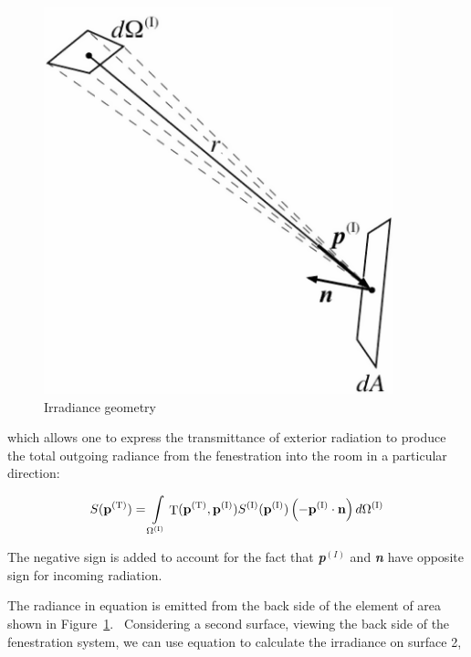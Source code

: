\begin{figure}[hbtp] %
\centering
\includegraphics[width=0.9\textwidth, height=0.9\textheight, keepaspectratio=true]{media/image1271.png}
\caption{Irradiance geometry \protect \label{fig:irradiance-geometry}}
\end{figure}

which allows one to express the transmittance of exterior radiation to produce the total outgoing radiance from the fenestration into the room in a particular direction:

\begin{equation}
S({{\bf{p}}^{{\rm{(T)}}}}) = \int\limits_{{\Omega ^{{\rm{(I)}}}}} {{\mathop{\rm T}\nolimits} ({{\bf{p}}^{{\rm{(T)}}}},{{\bf{p}}^{{\rm{(I)}}}}){S^{{\rm{(I)}}}}({{\bf{p}}^{{\rm{(I)}}}})\left( { - {{\bf{p}}^{{\rm{(I)}}}}\cdot {\bf{n}}} \right)d{\Omega ^{{\rm{(I)}}}}}
\end{equation}

The negative sign is added to account for the fact that \textbf{\emph{p}}\(^{(I)}\) and \textbf{\emph{n}} have opposite sign for incoming radiation.

The radiance in equation is emitted from the back side of the element of area shown in Figure~\ref{fig:irradiance-geometry}.~ Considering a second surface, viewing the back side of the fenestration system, we can use equation to calculate the irradiance on surface 2,

